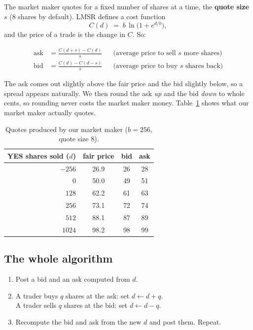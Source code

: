 \documentclass[11pt]{article}
\newcommand{\cent}{\textcent}
\begin{document}
The market maker quotes for a fixed number of shares at a time, the
\textbf{quote size} $s$ (8 shares by default). LMSR defines a cost function
\[
  C(d) \;=\; b \,\ln\!\bigl(1 + e^{d/b}\bigr),
\]
and the price of a trade is the change in $C$. So:

\begin{align*}
  \text{ask} &= \frac{C(d+s) - C(d)}{s} && \text{(average price to sell $s$ more shares)}\\[0.3em]
  \text{bid} &= \frac{C(d) - C(d-s)}{s} && \text{(average price to buy $s$ shares back)}
\end{align*}

The ask comes out slightly above the fair price and the bid slightly below, so
a spread appears naturally. We then round the ask \emph{up} and the bid
\emph{down} to whole cents, so rounding never costs the market maker money.
Table~\ref{tab:quotes} shows what our market maker actually quotes.

\begin{table}[h]
\centering
\begin{tabular}{rccc}
\toprule
YES shares sold ($d$) & fair price & bid & ask \\
\midrule
$-256$ & 26.9\cent & 26\cent & 28\cent \\
$0$    & 50.0\cent & 49\cent & 51\cent \\
$128$  & 62.2\cent & 61\cent & 63\cent \\
$256$  & 73.1\cent & 72\cent & 74\cent \\
$512$  & 88.1\cent & 87\cent & 89\cent \\
$1024$ & 98.2\cent & 98\cent & 99\cent \\
\bottomrule
\end{tabular}
\caption{Quotes produced by our market maker ($b = 256$, quote size 8).}
\label{tab:quotes}
\end{table}

\subsection{The whole algorithm}

\begin{enumerate}
  \item Post a bid and an ask computed from $d$.
  \item A trader buys $q$ shares at the ask: set $d \leftarrow d + q$.\\
        A trader sells $q$ shares at the bid: set $d \leftarrow d - q$.
  \item Recompute the bid and ask from the new $d$ and post them. Repeat.
\end{enumerate}
\end{document}
